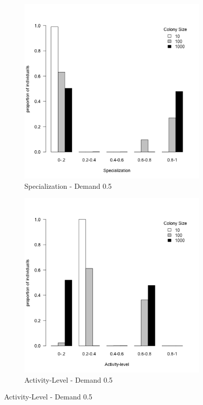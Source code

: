 \documentclass[a4paper]{article}
\begin{document}
\begin{figure}[!ht]
    \begin{subfigure}[b]{0.45\linewidth}
      \includegraphics[width=\linewidth]{2_Tasks_Spe_Demand_5}
      \caption{Specialization - Demand 0.5}\label{fig:2a}
    \end{subfigure}
    \hfill
    \begin{subfigure}[b]{0.45\linewidth}
      \includegraphics[width=\linewidth]{2_Tasks_Act1_demand_5}
      \caption{Activity-Level - Demand 0.5}\label{fig:2c}
     \end{subfigure}
     

\end{figure}
\end{document}
